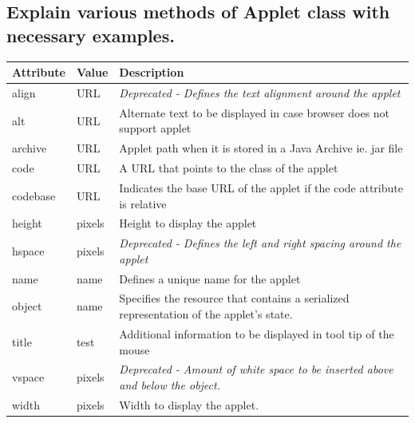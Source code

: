 \documentclass[11pt]{article}
\begin{document}
\subsection{Explain various methods of Applet class with necessary examples.}
\begin{table}[H]
	\begin{tabular}{|l|l|l|}
		\hline
		\textbf{Attribute} & \textbf{Value} & \textbf{Description}                                                                    \\ \hline
		align              & URL            & \textit{Deprecated - Defines the text alignment around the applet}                      \\ \hline
		alt                & URL            & Alternate text to be displayed in case browser does not support applet                  \\ \hline
		archive            & URL            & Applet path when it is stored in a Java Archive ie. jar file                            \\ \hline
		code               & URL            & A URL that points to the class of the applet                                            \\ \hline
		codebase           & URL            & Indicates the base URL of the applet if the code attribute is relative                  \\ \hline
		height             & pixels         & Height to display the applet                                                            \\ \hline
		hspace             & pixels         & \textit{Deprecated - Defines the left and right spacing around the applet}              \\ \hline
		name               & name           & Defines a unique name for the applet                                                    \\ \hline
		object             & name           & Specifies the resource that contains a serialized representation of the applet's state. \\ \hline
		title              & test           & Additional information to be displayed in tool tip of the mouse                         \\ \hline
		vspace             & pixels         & \textit{Deprecated - Amount of white space to be inserted above and below the object.}  \\ \hline
		width              & pixels         & Width to display the applet.                                                            \\ \hline
	\end{tabular}
\end{table}
\end{document}
